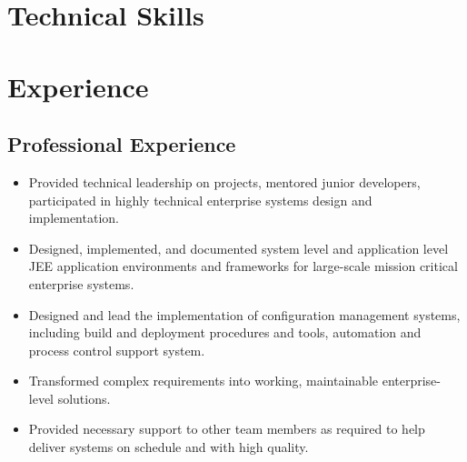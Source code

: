 \documentclass[11pt,letterpaper,sans]{moderncv} %
\begin{document}
\section{Technical Skills}



\section{Experience}

  \subsection{Professional Experience}
     {\begin{itemize}
         \item Provided technical leadership on projects, mentored junior 
               developers, participated in highly technical enterprise 
               systems design and implementation.
         \item Designed, implemented, and documented system level and 
               application level JEE application environments and frameworks 
               for large-scale mission critical enterprise systems.
         \item Designed and lead the implementation of configuration 
               management systems, including build and deployment procedures 
               and tools, automation and process control support system.
         \item Transformed complex requirements into working, maintainable 
               enterprise-level solutions.
         \item Provided necessary support to other team members as required 
               to help deliver systems on schedule and with high quality.
     \end{itemize}}
      
\end{document}
